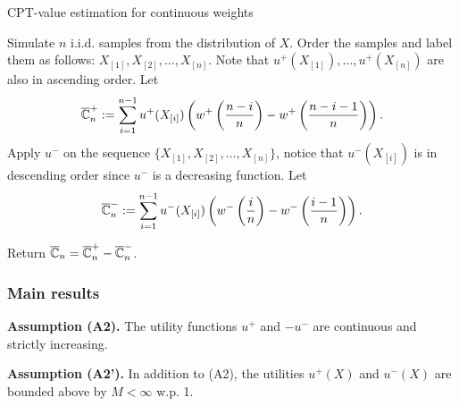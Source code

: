 \begin{algorithm}
\caption{CPT-value estimation for \holder continuous weights}
\label{alg:holder-est}
\begin{algorithmic}[1]
\State Simulate $n$ i.i.d. samples from the distribution of $X$.
\State Order the samples and label them as follows: 
$X_{[1]}, X_{[2]}, \ldots ,X_{[n]}$. Note that $u^+(X_{[1]}),\ldots ,u^+(X_{[n]})$ are also in ascending order.
\State Let
\vspace{-0.5ex}
$$\overline {\mathbb{C}}_n^+:=\sum_{i=1}^{n-1} u^+(X_{[i]}) \left(w^+\left(\frac{n-i}{n}\right)- w^+\left(\frac{n-i-1}{n}\right) \right).$$
\vspace{-0.5ex}
\State Apply $u^{-}$ on the sequence $\{X_{[1]}, X_{[2]}, \ldots ,X_{[n]}\}$, notice that $u^{-}(X_{[i]})$ is in descending order since $u^{-}$ is a decreasing function.     
\State Let
\vspace{-0.5ex}
$$\overline {\mathbb{C}}_n^-:=\sum_{i=1}^{n-1} u^-(X_{[i]}) \left(w^-\left(\frac{i}{n}\right)- w^-\left(\frac{i-1}{n}\right) \right). $$

\vspace{-0.5ex}
\State Return $\overline {\mathbb{C}}_n =\overline {\mathbb{C}}_n^+ - \overline {\mathbb{C}}_n^-$.
\end{algorithmic}
\end{algorithm}

\subsubsection*{Main results}
\textbf{Assumption (A2).}  The utility functions $u^+$ and $-u^-$ are continuous and strictly increasing.

\textbf{Assumption (A2').}  In addition to (A2), the utilities $u^+(X)$ and $u^-(X)$ are bounded above by $M<\infty$ w.p. 1.

